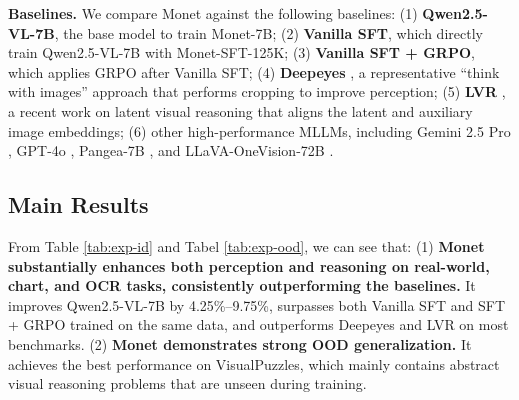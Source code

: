 \textbf{Baselines.} We compare Monet against the following baselines: (1) \textbf{Qwen2.5-VL-7B}, the base model to train Monet-7B; (2) \textbf{Vanilla SFT}, which directly train Qwen2.5-VL-7B with Monet-SFT-125K; (3) \textbf{Vanilla SFT + GRPO}, which applies GRPO after Vanilla SFT; (4) \textbf{Deepeyes} \citep{zheng2025deepeyes}, a representative ``think with images'' approach that performs cropping to improve perception; (5) \textbf{LVR} \citep{li2025latent}, a recent work on latent visual reasoning that aligns the latent and auxiliary image embeddings; (6) other high-performance MLLMs, including Gemini 2.5 Pro \citep{comanici2025gemini}, GPT-4o \citep{gpt_4o}, Pangea-7B \citep{yue2024pangea}, and LLaVA-OneVision-72B \citep{li2024llava}.


\subsection{Main Results}
From Table \ref{tab:exp-id} and Tabel \ref{tab:exp-ood}, we can see that: (1) \textbf{Monet substantially enhances both perception and reasoning on real-world, chart, and OCR tasks, consistently outperforming the baselines.} It improves Qwen2.5-VL-7B by 4.25\%–9.75\%, surpasses both Vanilla SFT and SFT + GRPO trained on the same data, and outperforms Deepeyes and LVR on most benchmarks. (2) \textbf{Monet demonstrates strong OOD generalization.} It achieves the best performance on VisualPuzzles, which mainly contains abstract visual reasoning problems that are unseen during training.



